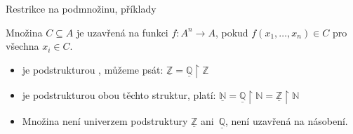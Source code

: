 \documentclass{beamer}
\begin{document}
\begin{frame}{Restrikce na podmnožinu, příklady}
    
    Množina $C\subseteq A$ je \alert{uzavřená} na funkci $f:A^n\to A$, pokud $f(x_1,\dots,x_n)\in C$ pro všechna $x_i\in C$.

    \medskip


    \medskip
    
    \begin{itemize}
        \item {} je podstrukturou , můžeme psát: \alert{$\underline{\mathbb Z}=\underline{\mathbb Q}\restriction\mathbb Z$}
        \item {} je podstrukturou obou těchto struktur, platí: \alert{$\underline{\mathbb N}=\underline{\mathbb Q}\restriction\mathbb N=\underline{\mathbb Z}\restriction\mathbb N$}
        \item Množina  není univerzem podstruktury $\underline{\mathbb Z}$ ani~$\underline{\mathbb Q}$, není uzavřená na násobení.
    \end{itemize}
\end{frame}
\end{document}
